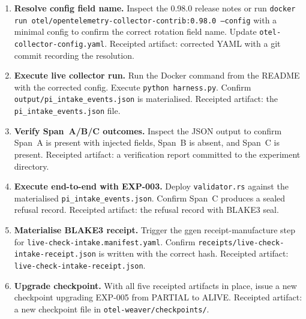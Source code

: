 \begin{enumerate}
  \item \textbf{Resolve config field name.} Inspect the 0.98.0 release notes or run
        \texttt{docker run otel/opentelemetry-collector-contrib:0.98.0 --config} with a
        minimal config to confirm the correct rotation field name. Update
        \texttt{otel-collector-config.yaml}. Receipted artifact: corrected YAML with a
        git commit recording the resolution.

  \item \textbf{Execute live collector run.} Run the Docker command from the README with
        the corrected config. Execute \texttt{python harness.py}. Confirm
        \texttt{output/pi\_intake\_events.json} is materialised. Receipted artifact:
        the \texttt{pi\_intake\_events.json} file.

  \item \textbf{Verify Span~A/B/C outcomes.} Inspect the JSON output to confirm Span~A is
        present with injected fields, Span~B is absent, and Span~C is present. Receipted
        artifact: a verification report committed to the experiment directory.

  \item \textbf{Execute end-to-end with EXP-003.} Deploy \texttt{validator.rs} against the
        materialised \texttt{pi\_intake\_events.json}. Confirm Span~C produces a sealed
        refusal record. Receipted artifact: the refusal record with BLAKE3 seal.

  \item \textbf{Materialise BLAKE3 receipt.} Trigger the ggen receipt-manufacture step for
        \texttt{live-check-intake.manifest.yaml}. Confirm
        \texttt{receipts/live-check-intake-receipt.json} is written with the correct hash.
        Receipted artifact: \texttt{live-check-intake-receipt.json}.

  \item \textbf{Upgrade checkpoint.} With all five receipted artifacts in place, issue a new
        checkpoint upgrading EXP-005 from PARTIAL to ALIVE. Receipted artifact: a new
        checkpoint file in \texttt{otel-weaver/checkpoints/}.
\end{enumerate}
